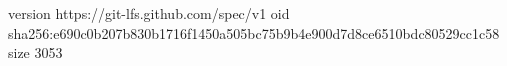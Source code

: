 version https://git-lfs.github.com/spec/v1
oid sha256:e690c0b207b830b1716f1450a505bc75b9b4e900d7d8ce6510bdc80529cc1c58
size 3053
